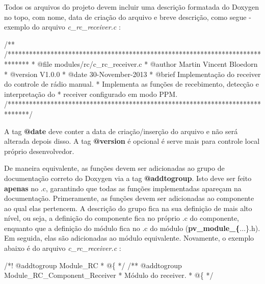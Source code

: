 Todos os arquivos do projeto devem incluir uma descrição formatada do Doxygen no topo, com nome, data de criação do arquivo e breve descrição, como segue -\/ exemplo do arquivo {\itshape c\+\_\+rc\+\_\+receiver.\+c} \+:


\begin{DoxyCode}
\textcolor{comment}{/**}
\textcolor{comment}{  /******************************************************************************}
\textcolor{comment}{  * @file    modules/rc/c\_rc\_receiver.c}
\textcolor{comment}{  * @author  Martin Vincent Bloedorn}
\textcolor{comment}{  * @version V1.0.0}
\textcolor{comment}{  * @date    30-November-2013}
\textcolor{comment}{  * @brief   Implementação do receiver do controle de rádio manual.}
\textcolor{comment}{  *          Implementa as funções de recebimento, detecção e interpretação do}
\textcolor{comment}{  *          receiver configurado em modo PPM.}
\textcolor{comment}{  /******************************************************************************/}
\end{DoxyCode}


A tag {\bfseries @date} deve conter a data de criação/inserção do arquivo e não será alterada depois disso. A tag {\bfseries @version} é opcional é serve mais para controle local próprio desenvolvedor.

De maneira equivalente, as funções devem ser adicionadas ao grupo de documentação correto do Doxygen via a tag {\bfseries @addtogroup}. Isto deve ser feito {\bfseries apenas} no {\itshape }.c, garantindo que todas as funções implementadas apareçam na documentação. Primeramente, as funções devem ser adicionadas ao componente ao qual elas pertencem. A descrição do grupo fica na sua definição de mais alto nível, ou seja, a definição do componente fica no próprio {\itshape }.c do componente, enquanto que a definição do módulo fica no {\itshape }.c do módulo ({\bfseries pv\+\_\+module\+\_\+\{}...{\bfseries }\}.h). Em seguida, elas são adicionadas ao módulo equivalente. Novamente, o exemplo abaixo é do arquivo {\itshape c\+\_\+rc\+\_\+receiver.\+c} \+:


\begin{DoxyCode}
\textcolor{comment}{/*! @addtogroup Module\_RC}
\textcolor{comment}{  * @\{}
\textcolor{comment}{  */}
  \textcolor{comment}{}
\textcolor{comment}{/** @addtogroup Module\_RC\_Component\_Receiver}
\textcolor{comment}{  }
\textcolor{comment}{ *  Módulo do receiver.}
\textcolor{comment}{  * @\{}
\textcolor{comment}{  */}
\end{DoxyCode}


